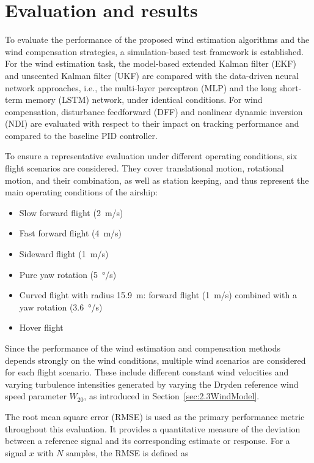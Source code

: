 \chapter{Evaluation and results}
\label{chap:5.0Evaluation}

To evaluate the performance of the proposed wind estimation algorithms and the wind compensation strategies, a simulation-based test framework is established.
For the wind estimation task, the model-based extended Kalman filter (EKF) and unscented Kalman filter (UKF) are compared with the data-driven neural network approaches, i.e., the multi-layer perceptron (MLP) and the long short-term memory (LSTM) network, under identical conditions. For wind compensation, disturbance feedforward (DFF) and nonlinear dynamic inversion (NDI) are evaluated with respect to their impact on tracking performance and compared to the baseline PID controller.

To ensure a representative evaluation under different operating conditions, six flight scenarios are considered. They cover translational motion, rotational motion, and their combination, as well as station keeping, and thus represent the main operating conditions of the airship:

\begin{itemize}
	\item Slow forward flight (\SI{2}{m/s})
	\item Fast forward flight (\SI{4}{m/s})
	\item Sideward flight (\SI{1}{m/s})
	\item Pure yaw rotation (\SI{5}{\degree/s})
	\item Curved flight with radius \SI{15.9}{m}: forward flight (\SI{1}{m/s}) combined with a yaw rotation (\SI{3.6}{\degree/s})
	\item Hover flight
\end{itemize}

Since the performance of the wind estimation and compensation methods depends strongly on the wind conditions, multiple wind scenarios are considered for each flight scenario. These include different constant wind velocities and varying turbulence intensities generated by varying the Dryden reference wind speed parameter $W_{20}$, as introduced in Section~\ref{sec:2.3WindModel}.

The root mean square error (RMSE) is used as the primary performance metric throughout this evaluation. It provides a quantitative measure of the deviation between a reference signal and its corresponding estimate or response. For a signal $x$ with $N$ samples, the RMSE is defined as \cite{Chai2014RMSE}

